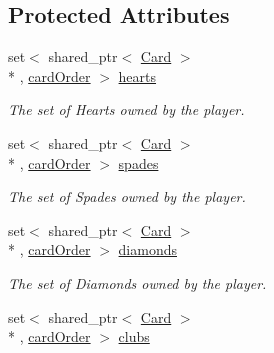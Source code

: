 \subsection*{Protected Attributes}
\begin{DoxyCompactItemize}
\item 
\hypertarget{classPlayer_afab8e372cfef87440bc42168d5fa0f6a}{set$<$ shared\-\_\-ptr$<$ \hyperlink{classCard}{Card} $>$\\*
, \hyperlink{structPlayer_1_1cardOrder}{card\-Order} $>$ \hyperlink{classPlayer_afab8e372cfef87440bc42168d5fa0f6a}{hearts}}\label{classPlayer_afab8e372cfef87440bc42168d5fa0f6a}

\begin{DoxyCompactList}\small\item\em The set of Hearts owned by the player. \end{DoxyCompactList}\item 
\hypertarget{classPlayer_a89177ee8076c1a3411a74b2b1d68156c}{set$<$ shared\-\_\-ptr$<$ \hyperlink{classCard}{Card} $>$\\*
, \hyperlink{structPlayer_1_1cardOrder}{card\-Order} $>$ \hyperlink{classPlayer_a89177ee8076c1a3411a74b2b1d68156c}{spades}}\label{classPlayer_a89177ee8076c1a3411a74b2b1d68156c}

\begin{DoxyCompactList}\small\item\em The set of Spades owned by the player. \end{DoxyCompactList}\item 
\hypertarget{classPlayer_a3ad0f1545e0653635eac5ced5c31dc0b}{set$<$ shared\-\_\-ptr$<$ \hyperlink{classCard}{Card} $>$\\*
, \hyperlink{structPlayer_1_1cardOrder}{card\-Order} $>$ \hyperlink{classPlayer_a3ad0f1545e0653635eac5ced5c31dc0b}{diamonds}}\label{classPlayer_a3ad0f1545e0653635eac5ced5c31dc0b}

\begin{DoxyCompactList}\small\item\em The set of Diamonds owned by the player. \end{DoxyCompactList}\item 
\hypertarget{classPlayer_ad3f3acdaf6ee318ba528e82e1c188820}{set$<$ shared\-\_\-ptr$<$ \hyperlink{classCard}{Card} $>$\\*
, \hyperlink{structPlayer_1_1cardOrder}{card\-Order} $>$ \hyperlink{classPlayer_ad3f3acdaf6ee318ba528e82e1c188820}{clubs}}\label{classPlayer_ad3f3acdaf6ee318ba528e82e1c188820}


\end{DoxyCompactItemize}
